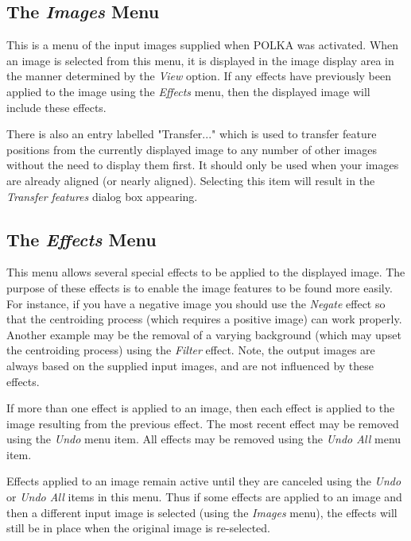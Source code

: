 \documentclass[11pt]{article}
\newcommand{\htmlref}[2]{#1}
\newcommand{\xlabel}[1]{}
\newcommand{\mylabel}[1] {\xlabel{#1}\label{#1}}
\begin{document}
\subsection {\mylabel{POLKA_IMAGES_MENU}The \emph{Images} Menu}
This is a menu of the input images supplied when POLKA was
activated. When an image is selected from this menu, it is displayed in
the \htmlref{image display area}{POLKA_IMAGE_DISPLAY} in the manner
determined by the \htmlref{\emph{View}}{POLKA_VIEW} option. If any
effects have previously been applied to the image using the \htmlref{{\em
Effects}}{POLKA_EFFECTS_MENU} menu, then the displayed image will
include these effects.

There is also an entry labelled "Transfer..." which is used to transfer
feature positions from the currently displayed image to any number of
other images without the need to display them first. It should only be
used when your images are already aligned (or nearly aligned). Selecting
this item will result in the \htmlref{\emph{Transfer features}}
{POLKA_TRANSFER_DIALOG} dialog box appearing.

\subsection {\mylabel{POLKA_EFFECTS_MENU}The \emph{Effects} Menu}
This menu allows several special effects to be applied to the displayed
image. The purpose of these effects is to enable the image features to be
found more easily. For instance, if you have a negative image you should
use the \htmlref{\emph{Negate}}{POLKA_NEGATE_EFFECT} effect so that the
centroiding process (which requires a positive image) can work properly.
Another example may be the removal of a varying background (which may upset
the centroiding process) using the
\htmlref{\emph{Filter}}{POLKA_FILTER_EFFECT} effect. Note, the output
images are always based on the supplied input images, and are not
influenced by these effects.

If more than one effect is applied to an image, then each effect is
applied to the image resulting from the previous effect. The most recent
effect may be removed using the \htmlref{\emph{Undo}}{POLKA_UNDO_EFFECT}
menu item. All effects may be removed using the \htmlref{\emph{Undo
All}}{POLKA_UNDO_ALL_EFFECT} menu item.

Effects applied to an image remain active until they are canceled using
the \htmlref{\emph{Undo}}{POLKA_UNDO_EFFECT} or
\htmlref{\emph{Undo All}}{POLKA_UNDO_ALL_EFFECTS} items in this menu. Thus
if some effects are applied to an image and then a different input image
is selected (using the \htmlref{\emph{Images}}{POLKA_IMAGES_MENU} menu),
the effects will still be in place when the original image is re-selected.
\end{document}
